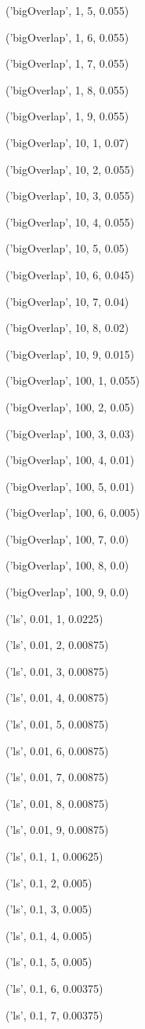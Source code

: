 \documentclass{paper}
\begin{document}
\begin{enumerate}
('bigOverlap', 1, 5, 0.055)

('bigOverlap', 1, 6, 0.055)

('bigOverlap', 1, 7, 0.055)

('bigOverlap', 1, 8, 0.055)

('bigOverlap', 1, 9, 0.055)

('bigOverlap', 10, 1, 0.07)

('bigOverlap', 10, 2, 0.055)

('bigOverlap', 10, 3, 0.055)

('bigOverlap', 10, 4, 0.055)

('bigOverlap', 10, 5, 0.05)

('bigOverlap', 10, 6, 0.045)

('bigOverlap', 10, 7, 0.04)

('bigOverlap', 10, 8, 0.02)

('bigOverlap', 10, 9, 0.015)

('bigOverlap', 100, 1, 0.055)

('bigOverlap', 100, 2, 0.05)

('bigOverlap', 100, 3, 0.03)

('bigOverlap', 100, 4, 0.01)

('bigOverlap', 100, 5, 0.01)

('bigOverlap', 100, 6, 0.005)

('bigOverlap', 100, 7, 0.0)

('bigOverlap', 100, 8, 0.0)

('bigOverlap', 100, 9, 0.0)

('ls', 0.01, 1, 0.0225)

('ls', 0.01, 2, 0.00875)

('ls', 0.01, 3, 0.00875)

('ls', 0.01, 4, 0.00875)

('ls', 0.01, 5, 0.00875)

('ls', 0.01, 6, 0.00875)

('ls', 0.01, 7, 0.00875)

('ls', 0.01, 8, 0.00875)

('ls', 0.01, 9, 0.00875)

('ls', 0.1, 1, 0.00625)

('ls', 0.1, 2, 0.005)

('ls', 0.1, 3, 0.005)

('ls', 0.1, 4, 0.005)

('ls', 0.1, 5, 0.005)

('ls', 0.1, 6, 0.00375)

('ls', 0.1, 7, 0.00375)


\end{enumerate}
\end{document}
